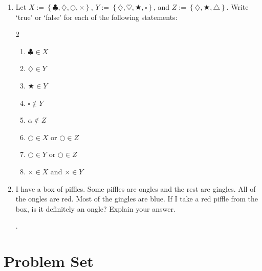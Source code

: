 \documentclass{tufte-book}
\begin{document}
\begin{enumerate}
  \item Let $X := \left\{\clubsuit, \diamondsuit, \bigcirc, \times\right\}$, $Y := \left\{\diamondsuit, \heartsuit, \bigstar, \square\right\}$, and $Z := \left\{\diamondsuit, \bigstar, \triangle\right\}$. 
  Write `true' or `false' for each of the following statements:
  \begin{multicols}{2}
  \begin{enumerate}
    \item $\clubsuit \in X$ \dotfill\bigskip
    \item $\diamondsuit \in Y$ \dotfill\bigskip
    \item $\bigstar \in Y$ \dotfill\bigskip
    \item $\square \notin Y$ \dotfill
    \item $\alpha \notin Z$ \dotfill\bigskip
    \item $\bigcirc \in X$ or $\bigcirc \in Z$ \dotfill\bigskip
    \item $\bigcirc \in Y$ or $\bigcirc \in Z$ \dotfill\bigskip
    \item $\times \in X$ and $\times \in Y$ \dotfill
  \end{enumerate}
  \end{multicols}

  \item I have a box of piffles. Some piffles are ongles and the rest are gingles.
  All of the ongles are red. Most of the gingles are blue. If I take a red piffle from the box,
  is it definitely an ongle? Explain your answer.\bigskip\par
  \dotfill\bigskip\par\dotfill\bigskip\par\dotfill.

\end{enumerate}

\clearpage\section{Problem Set }
\end{document}
